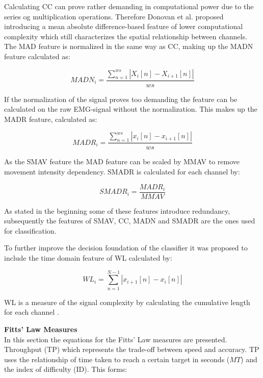 Calculating CC can prove rather demanding in computational power due to the series og multiplication operations. Therefore Donovan et al. \cite{Donovan2017} proposed introducing a mean absolute difference-based feature of lower computational complexity which still characterizes the spatial relationship between channels. The MAD feature is normalized in the same way as CC, making up the MADN feature calculated as: 

\begin{equation} \label{eq:MADN}
MADN_i=\frac{\sum\limits_{n=1}^{ws}|X_i[n]-X_{i+1}[n]|}{ws}
\end{equation}

If the normalization of the signal proves too demanding the feature can be calculated on the raw EMG-signal without the normalization. This makes up the MADR feature, calculated as:

\begin{equation} \label{eq:MADR}
MADR_i=\frac{\sum\limits_{n=1}^{ws}|x_i[n]-x_{i+1}[n]|}{ws}
\end{equation}

As the SMAV feature the MAD feature can be scaled by MMAV to remove movement intensity dependency. SMADR is calculated for each channel by:

\begin{equation} \label{eq:MMADR}
SMADR_i=\frac{MADR_i}{MMAV}
\end{equation}


As stated in the beginning some of these features introduce redundancy, subsequently the features of SMAV, CC, MADN and SMADR are the ones used for classification. \cite{Donovan2017}

To further improve the decision foundation of the classifier it was proposed to include the time domain feature of WL calculated by: 

\begin{equation} \label{eq:WL}
WL_i=\sum\limits_{n=1}^{N-1}|x_{i+1}[n]-x_i[n]|
\end{equation}

WL is a measure of the signal complexity by calculating the cumulative length for each channel \cite{Phiny2012}.




\textbf{Fitts' Law Measures} \\
In this section the equations for the Fitts' Law measures are presented. \\
Throughput (TP) which represents the trade-off between speed and accuracy. TP uses the relationship of time taken to reach a certain target in seconds ($MT$) and the index of difficulty (ID). This forms: \cite{Scheme2013,Fitts1954}

